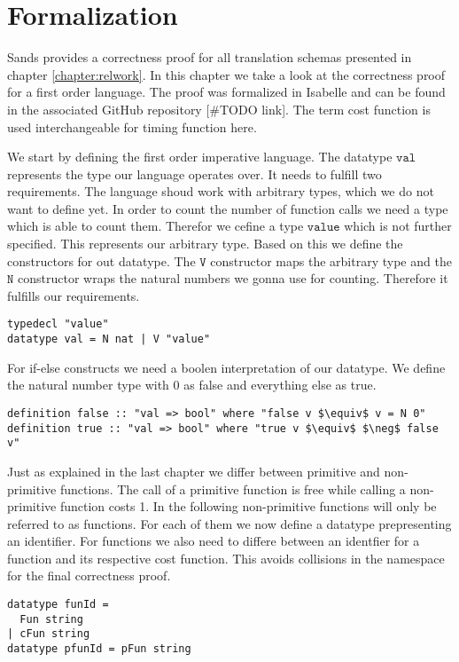 
\chapter{Formalization}\label{chapter:formal}

Sands provides a correctness proof for all translation schemas presented in chapter \ref{chapter:relwork}.
In this chapter we take a look at the correctness proof for a first order language.
The proof was formalized in Isabelle and can be found in the associated GitHub repository [\#TODO link].
The term cost function is used interchangeable for timing function here.

We start by defining the first order imperative language.
The datatype $\texttt{val}$ represents the type our language operates over.
It needs to fulfill two requirements.
The language shoud work with arbitrary types, which we do not want to define yet.
In order to count the number of function calls we need a type which is able to count them.
Therefor we cefine a type $\texttt{value}$ which is not further specified.
This represents our arbitrary type.
Based on this we define the constructors for out datatype.
The $\texttt{V}$ constructor maps the arbitrary type and the $\texttt{N}$ constructor wraps the natural numbers we gonna use for counting.
Therefore it fulfills our requirements.
\begin{lstlisting}[language=isabelle]
typedecl "value"
datatype val = N nat | V "value"
\end{lstlisting}

For if-else constructs we need a boolen interpretation of our datatype.
We define the natural number type with 0 as false and everything else as true.
\begin{lstlisting}[mathescape=true,language=isabelle]
definition false :: "val => bool" where "false v $\equiv$ v = N 0"
definition true :: "val => bool" where "true v $\equiv$ $\neg$ false v"
\end{lstlisting}

Just as explained in the last chapter we differ between primitive and non-primitive functions.
The call of a primitive function is free while calling a non-primitive function costs 1.
In the following non-primitive functions will only be referred to as functions.
For each of them we now define a datatype prepresenting an identifier.
For functions we also need to differe between an identfier for a function and its respective cost function.
This avoids collisions in the namespace for the final correctness proof.
\begin{lstlisting}[language=isabelle]
datatype funId =
  Fun string
| cFun string
datatype pfunId = pFun string
\end{lstlisting}

